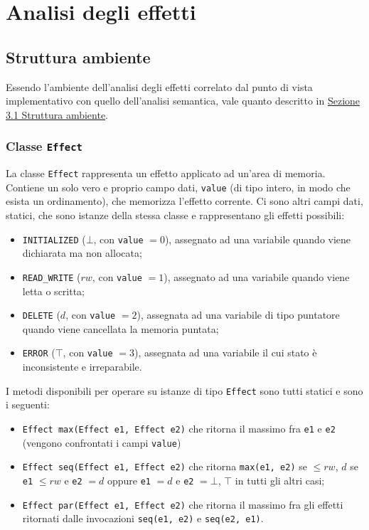 \documentclass[../report.tex]{subfiles}
\begin{document}
\chapter{Analisi degli effetti}\label{c:analisi-effetti}
\section{Struttura ambiente}\label{s:struttura-ambiente-effetti}
Essendo l'ambiente dell'analisi degli effetti correlato dal punto di vista implementativo con quello dell'analisi semantica, vale quanto descritto in \hyperref[s:struttura-ambiente]{Sezione 3.1 Struttura ambiente}.

\subsection[Classe Effect]{Classe \texttt{Effect}}\label{ss:effect-effetti}
La classe \verb|Effect| rappresenta un effetto applicato ad un'area di memoria.
Contiene un solo vero e proprio campo dati, \verb|value| (di tipo intero, in modo che esista un ordinamento), che memorizza l'effetto corrente.
Ci sono altri campi dati, statici, che sono istanze della stessa classe e rappresentano gli effetti possibili:
\begin{itemize}
    \item \verb|INITIALIZED| ($\bot$, con \verb|value| $= 0$), assegnato ad una variabile quando viene dichiarata ma non allocata;
    \item \verb|READ_WRITE| ($rw$, con \verb|value| $= 1$), assegnato ad una variabile quando viene letta o scritta;
    \item \verb|DELETE| ($d$, con \verb|value| $= 2$), assegnata ad una variabile di tipo puntatore quando viene cancellata la memoria puntata;
    \item \verb|ERROR| ($\top$, con \verb|value| $= 3$), assegnata ad una variabile il cui stato è inconsistente e irreparabile.
\end{itemize}
I metodi disponibili per operare su istanze di tipo \verb|Effect| sono tutti statici e sono i seguenti:
\begin{itemize}
    \item \verb|Effect max(Effect e1, Effect e2)| che ritorna il massimo fra \verb|e1| e \verb|e2| (vengono confrontati i campi \verb|value|)
    \item \verb|Effect seq(Effect e1, Effect e2)| che ritorna \verb|max(e1, e2)| se $\leq{} rw$, $d$ se \verb|e1| $\leq{} rw$ e \verb|e2| $= d$ oppure \verb|e1| $= d$ e \verb|e2| $= \bot$, $\top$ in tutti gli altri casi;
    \item \verb|Effect par(Effect e1, Effect e2)| che ritorna il massimo fra gli effetti ritornati dalle invocazioni \verb|seq(e1, e2)| e \verb|seq(e2, e1)|.
\end{itemize}
\end{document}
